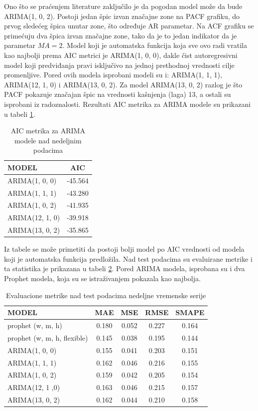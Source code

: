\documentclass[12pt,oneside]{memoir}
\begin{document}
Ono što se praćenjem literature zaključilo je da pogodan model može da bude ARIMA(1, 0, 2). Postoji jedan špic izvan značajne zone na PACF grafiku, do prvog sledećeg špica unutar zone, što određuje AR parametar. Na ACF grafiku se primećuju dva špica izvan značajne zone, tako da je to jedan indikator da je parametar $MA=2$. Model koji je automatska funkcija koja sve ovo radi vratila kao najbolji prema AIC metrici je ARIMA(1, 0, 0), dakle čist autoregresivni model koji predviđanja pravi isključivo na jednoj prethodnoj vrednosti cilje promenljive. Pored ovih modela isprobani modeli su i: ARIMA(1, 1, 1), ARIMA(12, 1, 0) i ARIMA(13, 0, 2). Za model ARIMA(13, 0, 2) razlog je što PACF pokazuje značajan špic na vrednosti kašnjenja (laga) 13, a ostali su isprobani iz radoznalosti. Rezultati AIC metrika za ARIMA modele su prikazani u tabeli \ref{tbl: arima_aic_nedeljna}.
\begin{table}[!ht]
\centering
\caption{AIC metrika za ARIMA modele nad nedeljnim podacima}
\label{tbl: arima_aic_nedeljna}
\begin{tabular}{ |l|c|} 
\hline
MODEL & AIC \\
\hline
ARIMA(1, 0, 0) & -45.564\\
ARIMA(1, 1, 1) & -43.280\\
ARIMA(1, 0, 2) & -41.935\\
ARIMA(12, 1, 0) & -39.918\\
ARIMA(13, 0, 2) & -35.865\\
\hline
\end{tabular}
\end{table}
Iz tabele se može primetiti da postoji bolji model po AIC vrednosti od modela koji je automatska funkcija predložila. Nad test podacima su evaluirane metrike i ta statistika je prikazana u tabeli \ref{tbl: nedeljna_serija_metrike}. Pored ARIMA modela, isprobana su i dva Prophet modela, koja su se istraživanjem pokazala kao najbolja.
\begin{table}
\centering
\caption{Evaluacione metrike nad test podacima nedeljne vremenske serije}
\label{tbl: nedeljna_serija_metrike}
\begin{tabular}{ |l|c|c|c|c|} 
\hline
MODEL & MAE & MSE & RMSE & SMAPE\\
\hline
prophet (w, m, h) & 0.180 & 0.052 & 0.227 & 0.164\\
prophet (w, m, h, flexible) & 0.145 & 0.038 & 0.195 & 0.144\\
ARIMA(1, 0, 0) & 0.155 & 0.041 & 0.203 & 0.151\\
ARIMA(1, 1, 1) & 0.162 & 0.046 & 0.216 & 0.155\\
ARIMA(1, 0, 2) & 0.159 & 0.042 & 0.205 & 0.154\\
ARIMA(12, 1 ,0) & 0.163 & 0.046 & 0.215 & 0.157\\
ARIMA(13, 0, 2) & 0.162 & 0.044 & 0.210 & 0.158\\
\hline
\end{tabular}
\end{table}
\end{document}
